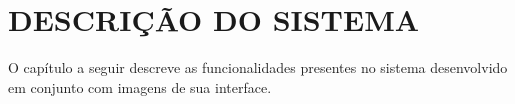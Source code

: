 \chapter{DESCRIÇÃO DO SISTEMA}
\label{chap:descricao}

O capítulo a seguir descreve as funcionalidades presentes no sistema desenvolvido em conjunto com imagens de sua interface.











